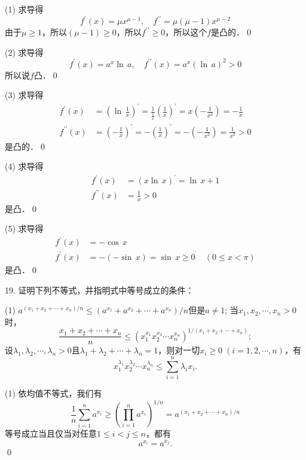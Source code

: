(1) \prove 求导得
\begin{equation}
    f^{\prime}(x) = \mu x^{\mu - 1}, \quad f^{\prime\prime} = \mu \left(\mu - 1\right) x^{\mu - 2}
\end{equation}
由于$\mu \geq 1$，所以$\left(\mu - 1\right) \geq 0$，所以$f^{\prime\prime} \geq 0$，所以这个$f$是凸的．\qed\bigskip

(2) \prove 求导得
\begin{equation}
    f^{\prime}(x) = a^x \ln \, a, \quad f^{\prime\prime}(x) = a^x \left( \ln \, a\right)^2 > 0
\end{equation}
所以说$f$凸．\qed\bigskip

(3) \prove 求导得
\begin{align}
    f^{\prime}(x) &= \left( \ln \, \frac{1}{x}\right)^\prime = \displaystyle\frac{1}{\displaystyle\frac{1}{x}} \left(\displaystyle\frac{1}{x}\right)^{\prime} = x \left(- \frac{1}{x^2}\right) = -\frac{1}{x} \\
    f^{\prime\prime}(x) &= \left(- \displaystyle\frac{1}{x}\right)^{\prime} = - \left(\displaystyle\frac{1}{x}\right)^{\prime} = - \left(- \frac{1}{x^2}\right) = \frac{1}{x^2} > 0
\end{align}
是凸的．\qed\bigskip

(4) \prove 求导得
\begin{align}
    f^{\prime}(x) &= \left(x \ln \, x\right)^{\prime} = \ln \, x + 1  \\
    f^{\prime\prime}(x) &= \frac{1}{x} > 0
\end{align}
是凸．\qed\bigskip

(5) \prove 求导得
\begin{align}
    f^{\prime}(x) &= - \cos \, x \\
    f^{\prime}(x) &= - \left(- \sin \, x\right) = \sin \, x \geq 0 \, \quad (0 \leq x < \pi)
\end{align}
是凸．\qed\bigskip

19. 证明下列不等式，并指明式中等号成立的条件：

\begin{tasks}(1)
    \task $a^{(x_1+x_2+\cdots+x_n)/n} \leq \left(a^{x_1}+a^{x_2}+\cdots+a^{x_n}\right)/n$但是$a \neq 1$;
    \task 当$x_1,x_2,\cdots , x_n > 0$时，
    \begin{equation*}
        \frac{x_1+x_2+\cdots +x_n}{n} \leq \left(x_1^{x_1}x_2^{x_2}\cdots x_n^{x_n}\right)^{1/\left(x_1+x_2+\cdots+x_n\right)};
    \end{equation*}
    \task 设$\lambda_1, \lambda_2, \cdots, \lambda_n > 0$且$\lambda_1 + \lambda_2 + \cdots + \lambda_n = 1$，则对一切$x_i \geq 0 \; (i = 1,2,\cdots,n)$，有
    \begin{equation*}
        x_1^{\lambda_1}x_2^{\lambda_2}\cdots x_n^{\lambda_n} \leq \sum_{i=1}^n \lambda_i x_i.
    \end{equation*}
\end{tasks}

(1) \prove 依均值不等式，我们有
\begin{equation}
    \frac{1}{n}\sum_{i=1}^n a^{x_i} \geq \left(\prod_{i=1}^n a^{x_i}\right)^{1/n} = a^{(x_1+x_2+\cdots +x_n)/n}
\end{equation}
等号成立当且仅当对任意$1 \leq i < j \leq n$，都有
\begin{equation}
    a^{x_i} = a^{x_j}.
\end{equation}
\qed\bigskip